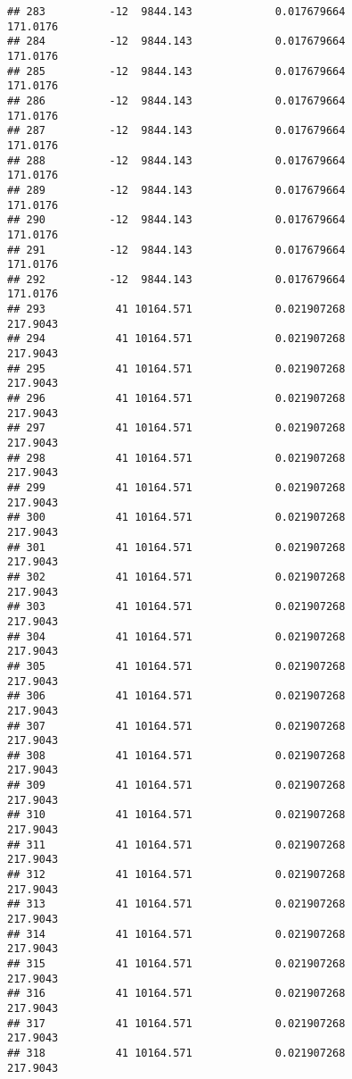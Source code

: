 \documentclass[]{article}
\begin{document}
\begin{verbatim}
## 283          -12  9844.143             0.017679664           171.0176
## 284          -12  9844.143             0.017679664           171.0176
## 285          -12  9844.143             0.017679664           171.0176
## 286          -12  9844.143             0.017679664           171.0176
## 287          -12  9844.143             0.017679664           171.0176
## 288          -12  9844.143             0.017679664           171.0176
## 289          -12  9844.143             0.017679664           171.0176
## 290          -12  9844.143             0.017679664           171.0176
## 291          -12  9844.143             0.017679664           171.0176
## 292          -12  9844.143             0.017679664           171.0176
## 293           41 10164.571             0.021907268           217.9043
## 294           41 10164.571             0.021907268           217.9043
## 295           41 10164.571             0.021907268           217.9043
## 296           41 10164.571             0.021907268           217.9043
## 297           41 10164.571             0.021907268           217.9043
## 298           41 10164.571             0.021907268           217.9043
## 299           41 10164.571             0.021907268           217.9043
## 300           41 10164.571             0.021907268           217.9043
## 301           41 10164.571             0.021907268           217.9043
## 302           41 10164.571             0.021907268           217.9043
## 303           41 10164.571             0.021907268           217.9043
## 304           41 10164.571             0.021907268           217.9043
## 305           41 10164.571             0.021907268           217.9043
## 306           41 10164.571             0.021907268           217.9043
## 307           41 10164.571             0.021907268           217.9043
## 308           41 10164.571             0.021907268           217.9043
## 309           41 10164.571             0.021907268           217.9043
## 310           41 10164.571             0.021907268           217.9043
## 311           41 10164.571             0.021907268           217.9043
## 312           41 10164.571             0.021907268           217.9043
## 313           41 10164.571             0.021907268           217.9043
## 314           41 10164.571             0.021907268           217.9043
## 315           41 10164.571             0.021907268           217.9043
## 316           41 10164.571             0.021907268           217.9043
## 317           41 10164.571             0.021907268           217.9043
## 318           41 10164.571             0.021907268           217.9043

\end{verbatim}
\end{document}
